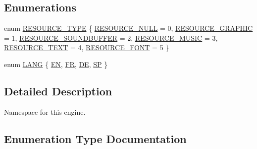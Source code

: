 \subsection*{Enumerations}
\begin{DoxyCompactItemize}
\item 
enum \mbox{\hyperlink{namespacesfmlbe_ac4335ed3060bba025f73e01f9dccb2dd}{R\+E\+S\+O\+U\+R\+C\+E\+\_\+\+T\+Y\+PE}} \{ \newline
\mbox{\hyperlink{namespacesfmlbe_ac4335ed3060bba025f73e01f9dccb2dda8d19259bccf0ab6ee075b32fff6f7e54}{R\+E\+S\+O\+U\+R\+C\+E\+\_\+\+N\+U\+LL}} = 0, 
\mbox{\hyperlink{namespacesfmlbe_ac4335ed3060bba025f73e01f9dccb2dda660c8cdfebf28528f6f0631ae29f89a5}{R\+E\+S\+O\+U\+R\+C\+E\+\_\+\+G\+R\+A\+P\+H\+IC}} = 1, 
\mbox{\hyperlink{namespacesfmlbe_ac4335ed3060bba025f73e01f9dccb2dda06cb8047cf98a2679b83166ad27d2708}{R\+E\+S\+O\+U\+R\+C\+E\+\_\+\+S\+O\+U\+N\+D\+B\+U\+F\+F\+ER}} = 2, 
\mbox{\hyperlink{namespacesfmlbe_ac4335ed3060bba025f73e01f9dccb2ddab44bcfdfdfd1fd38857b8ad914608007}{R\+E\+S\+O\+U\+R\+C\+E\+\_\+\+M\+U\+S\+IC}} = 3, 
\newline
\mbox{\hyperlink{namespacesfmlbe_ac4335ed3060bba025f73e01f9dccb2dda9550a304907119d426805e6ed9a6c193}{R\+E\+S\+O\+U\+R\+C\+E\+\_\+\+T\+E\+XT}} = 4, 
\mbox{\hyperlink{namespacesfmlbe_ac4335ed3060bba025f73e01f9dccb2dda7eae53eb53c90d3adcdfa9a16ebc34b7}{R\+E\+S\+O\+U\+R\+C\+E\+\_\+\+F\+O\+NT}} = 5
 \}
\item 
enum \mbox{\hyperlink{namespacesfmlbe_add7861f7feda29864e1760490cd2eb15}{L\+A\+NG}} \{ \mbox{\hyperlink{namespacesfmlbe_add7861f7feda29864e1760490cd2eb15aa40aa84e9e7799c8af50550a2ac17c38}{EN}}, 
\mbox{\hyperlink{namespacesfmlbe_add7861f7feda29864e1760490cd2eb15ab5c87eb879bd8b0de0897fdc995ff17c}{FR}}, 
\mbox{\hyperlink{namespacesfmlbe_add7861f7feda29864e1760490cd2eb15a3b7cf0aa10051afb9febea3f0c570495}{DE}}, 
\mbox{\hyperlink{namespacesfmlbe_add7861f7feda29864e1760490cd2eb15ac4b5a57b91d3e35a463bb7ea672fadd2}{SP}}
 \}
\end{DoxyCompactItemize}


\subsection{Detailed Description}
Namespace for this engine. 

\subsection{Enumeration Type Documentation}
\mbox{\label{namespacesfmlbe_add7861f7feda29864e1760490cd2eb15}} 
